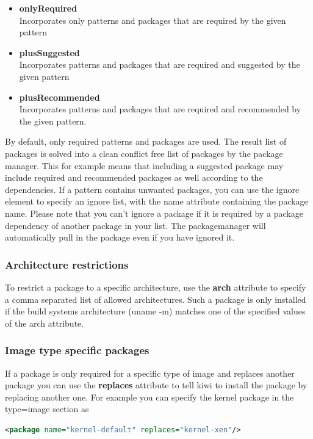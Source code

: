 \begin{itemize}
\item \textbf{onlyRequired}\\
      Incorporates only patterns and packages that are required by the
      given pattern
\item \textbf{plusSuggested}\\
      Incorporates patterns and packages that are required
      and suggested by the given pattern
\item \textbf{plusRecommended}\\
      Incorporates patterns and packages that are required and
      recommended by the given pattern.
\end{itemize}

By default, only required patterns and packages are used. The result
list of packages is solved into a clean conflict free list of packages
by the package manager. This for example means that including a suggested
package may include required and recommended packages as well according
to the dependencies. If a pattern contains unwanted packages, you can use
the ignore element to specify an ignore list, with the name attribute
containing the package name. Please note that you can't ignore a package
if it is required by a package dependency of another package in your list.
The packagemanager will automatically pull in the package even if you have
ignored it.

\subsubsection{Architecture restrictions}
To restrict a package to a specific architecture, use
the \textbf{arch} attribute to specify a comma separated list of allowed
architectures. Such a package is only installed if the build systems
architecture (uname -m) matches one of the specified values of the arch
attribute.

\subsubsection{Image type specific packages}
If a package is only required for a specific type of image
and replaces another package you can use the \textbf{replaces} attribute
to tell kiwi to install the package by replacing another one. For example
you can specify the kernel package in the type=image section as

\begin{lstlisting}[language=xml]
<package name="kernel-default" replaces="kernel-xen"/>
\end{lstlisting}

